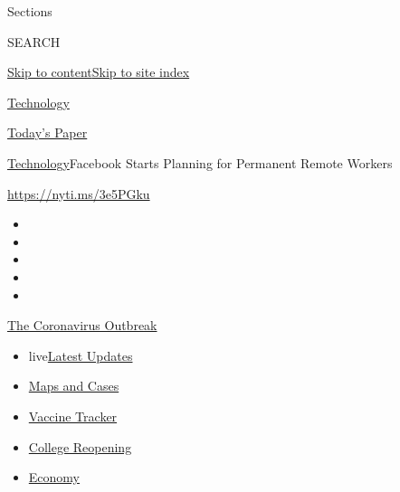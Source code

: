 Sections

SEARCH

\protect\hyperlink{site-content}{Skip to
content}\protect\hyperlink{site-index}{Skip to site index}

\href{https://www.nytimes3xbfgragh.onion/section/technology}{Technology}

\href{https://myaccount.nytimes3xbfgragh.onion/auth/login?response_type=cookie\&client_id=vi}{}

\href{https://www.nytimes3xbfgragh.onion/section/todayspaper}{Today's
Paper}

\href{/section/technology}{Technology}\textbar{}Facebook Starts Planning
for Permanent Remote Workers

\url{https://nyti.ms/3e5PGku}

\begin{itemize}
\item
\item
\item
\item
\item
\end{itemize}

\href{https://www.nytimes3xbfgragh.onion/news-event/coronavirus?action=click\&pgtype=Article\&state=default\&region=TOP_BANNER\&context=storylines_menu}{The
Coronavirus Outbreak}

\begin{itemize}
\tightlist
\item
  live\href{https://www.nytimes3xbfgragh.onion/2020/08/03/world/coronavirus-covid-19.html?action=click\&pgtype=Article\&state=default\&region=TOP_BANNER\&context=storylines_menu}{Latest
  Updates}
\item
  \href{https://www.nytimes3xbfgragh.onion/interactive/2020/us/coronavirus-us-cases.html?action=click\&pgtype=Article\&state=default\&region=TOP_BANNER\&context=storylines_menu}{Maps
  and Cases}
\item
  \href{https://www.nytimes3xbfgragh.onion/interactive/2020/science/coronavirus-vaccine-tracker.html?action=click\&pgtype=Article\&state=default\&region=TOP_BANNER\&context=storylines_menu}{Vaccine
  Tracker}
\item
  \href{https://www.nytimes3xbfgragh.onion/2020/08/02/us/covid-college-reopening.html?action=click\&pgtype=Article\&state=default\&region=TOP_BANNER\&context=storylines_menu}{College
  Reopening}
\item
  \href{https://www.nytimes3xbfgragh.onion/live/2020/08/03/business/stock-market-today-coronavirus?action=click\&pgtype=Article\&state=default\&region=TOP_BANNER\&context=storylines_menu}{Economy}
\end{itemize}

